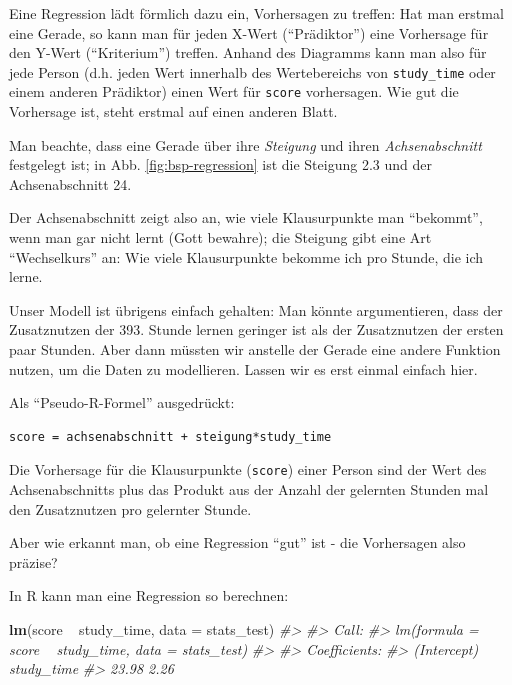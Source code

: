 \documentclass[12pt,ngerman,]{book}
\makeatletter
\newenvironment{Shaded}{\begin{snugshade}}{\end{snugshade}}
\newcommand{\KeywordTok}[1]{\textcolor[rgb]{0.13,0.29,0.53}{\textbf{{#1}}}}
\newcommand{\DataTypeTok}[1]{\textcolor[rgb]{0.13,0.29,0.53}{{#1}}}
\newcommand{\StringTok}[1]{\textcolor[rgb]{0.31,0.60,0.02}{{#1}}}
\newcommand{\CommentTok}[1]{\textcolor[rgb]{0.56,0.35,0.01}{\textit{{#1}}}}
\newcommand{\NormalTok}[1]{{#1}}
\newenvironment{kframe}{%
\medskip{}
\setlength{\fboxsep}{.8em}
 \def\at@end@of@kframe{}%
 \ifinner\ifhmode%
  \def\at@end@of@kframe{\end{minipage}}%
  \begin{minipage}{\columnwidth}%
 \fi\fi%
 \def\FrameCommand##1{\hskip\@totalleftmargin \hskip-\fboxsep
 \colorbox{shadecolor}{##1}\hskip-\fboxsep
     \hskip-\linewidth \hskip-\@totalleftmargin \hskip\columnwidth}%
 \MakeFramed {\advance\hsize-\width
   \@totalleftmargin\z@ \linewidth\hsize
   \@setminipage}}%
 {\par\unskip\endMakeFramed%
 \at@end@of@kframe}
\renewenvironment{Shaded}{\begin{kframe}}{\end{kframe}}
\makeatother
\begin{document}
Eine Regression lädt förmlich dazu ein, Vorhersagen zu treffen: Hat man
erstmal eine Gerade, so kann man für jeden X-Wert (``Prädiktor'') eine
Vorhersage für den Y-Wert (``Kriterium'') treffen. Anhand des Diagramms
kann man also für jede Person (d.h. jeden Wert innerhalb des
Wertebereichs von \texttt{study\_time} oder einem anderen Prädiktor)
einen Wert für \texttt{score} vorhersagen. Wie gut die Vorhersage ist,
steht erstmal auf einen anderen Blatt.

Man beachte, dass eine Gerade über ihre \emph{Steigung} und ihren
\emph{Achsenabschnitt} festgelegt ist; in Abb. \ref{fig:bsp-regression}
ist die Steigung 2.3 und der Achsenabschnitt 24.

Der Achsenabschnitt zeigt also an, wie viele Klausurpunkte man
``bekommt'', wenn man gar nicht lernt (Gott bewahre); die Steigung gibt
eine Art ``Wechselkurs'' an: Wie viele Klausurpunkte bekomme ich pro
Stunde, die ich lerne.

Unser Modell ist übrigens einfach gehalten: Man könnte argumentieren,
dass der Zusatznutzen der 393. Stunde lernen geringer ist als der
Zusatznutzen der ersten paar Stunden. Aber dann müssten wir anstelle der
Gerade eine andere Funktion nutzen, um die Daten zu modellieren. Lassen
wir es erst einmal einfach hier.

Als ``Pseudo-R-Formel'' ausgedrückt:

\begin{verbatim}
score = achsenabschnitt + steigung*study_time
\end{verbatim}

Die Vorhersage für die Klausurpunkte (\texttt{score}) einer Person sind
der Wert des Achsenabschnitts plus das Produkt aus der Anzahl der
gelernten Stunden mal den Zusatznutzen pro gelernter Stunde.

Aber wie erkannt man, ob eine Regression ``gut'' ist - die Vorhersagen
also präzise?

In R kann man eine Regression so berechnen:

\begin{Shaded}
\begin{Highlighting}[]
\KeywordTok{lm}\NormalTok{(score ~}\StringTok{ }\NormalTok{study_time, }\DataTypeTok{data =} \NormalTok{stats_test)}
\CommentTok{#> }
\CommentTok{#> Call:}
\CommentTok{#> lm(formula = score ~ study_time, data = stats_test)}
\CommentTok{#> }
\CommentTok{#> Coefficients:}
\CommentTok{#> (Intercept)   study_time  }
\CommentTok{#>       23.98         2.26}
\end{Highlighting}
\end{Shaded}
\end{document}
